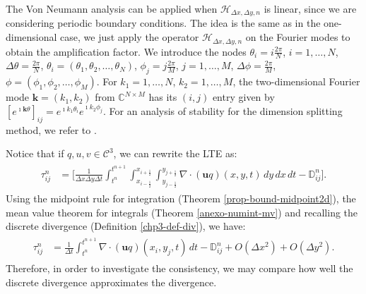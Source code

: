 The Von Neumann analysis can be applied when $\mathcal{H}_{\Delta x ,\Delta y,n}$ is linear, since we are considering periodic boundary conditions.
The idea is the same as in the one-dimensional case, we just apply the operator $\mathcal{H}_{\Delta x ,\Delta y,n}$ on the Fourier modes to obtain
the amplification factor.
We introduce the nodes $\theta_i = i\frac{2\pi}{N}$, $i=1, \ldots, N$, $\Delta \theta = \frac{2\pi}{N}$,
$\theta_i = (\theta_1, \theta_2, \ldots, \theta_N)$, $\phi_j = j\frac{2\pi}{M}$, $j=1, \ldots, M$, $\Delta \phi = \frac{2\pi}{M}$,
$\phi = (\phi_1, \phi_2, \ldots, \phi_M)$.
For $k_1=1, \ldots, N$, $k_2=1, \ldots, M$, the two-dimensional Fourier mode $\boldsymbol{k} = (k_1,k_2)$ from $\mathbb{C}^{N\times M}$ 
has its $(i,j)$ entry given by $[e^{\imath \boldsymbol{k} \theta}]_{ij} = e^{\imath k_1 \theta_i}e^{\imath k_2 \phi_j}$. 
For an analysis of stability for the dimension splitting method, we refer to \citet{lin:1996,lauritzen:2007}.

Notice that if $q,u, v \in \mathcal{C}^3$, we can rewrite the LTE as:
\begin{align*}
	\begin{split}
		\tau_{ij}^n &= 
		\bigg[ \frac{1}{\Delta x \Delta y \Delta t}  \int_{t^{n}}^{t^{n+1}}\int_{x_{i-\frac{1}{2}}}^{x_{i+\frac{1}{2}}} 
		\int_{y_{j-\frac{1}{2}}}^{y_{j+\frac{1}{2}}} {\nabla \cdot (\boldsymbol{u}q)}(x, y, t) \,dy \,dx \,dt 
        -\mathbb{D}_{ij}^n
		\bigg].
	\end{split}
\end{align*}
Using the midpoint rule for integration (Theorem \ref{prop-bound-midpoint2d}), the mean value theorem for integrals
(Theorem \ref{anexo-numint-mv}) and recalling the discrete divergence (Definition \ref{chp3-def-div}), we have:
\begin{align}
	\begin{split}
		\label{consistency-2d-eq}
		\tau_{ij}^n 
		&= \frac{1}{\Delta t}  \int_{t^{n}}^{t^{n+1}}
		{\nabla \cdot (\boldsymbol{u}q)}(x_i, y_j, t)  \,dt - 
		\mathbb{D}^n_{ij} + O(\Delta x^2) + O(\Delta y^2).
	\end{split}
\end{align}
Therefore, in order to investigate the consistency, we may compare how well the discrete divergence approximates the divergence.

